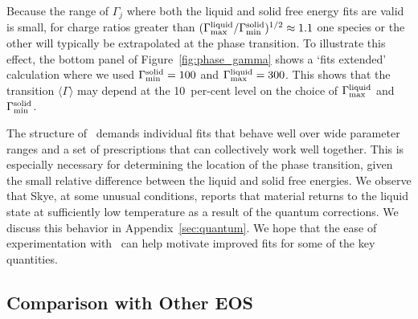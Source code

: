 %
%
%
Because the range of $\Gamma_j$ where both the liquid and solid free
energy fits are valid is small, for charge ratios greater than
$(\Gamma_{\rm max}^{\rm liquid}/\Gamma_{\rm min}^{\rm solid})^{1/2}
\approx 1.1$ one species or the other will typically be extrapolated
at the phase transition.  To illustrate this effect, the bottom panel
of Figure~\ref{fig:phase_gamma} shows a `fits extended' calculation
where we used $\Gamma_{\rm min}^{\rm solid}=100$ and
$\Gamma_{\rm max}^{\rm liquid} = 300$.  This shows that the
transition $\langle\Gamma\rangle$ may depend at the 10~per-cent level
on the choice of $\Gamma_{\rm max}^{\rm liquid}$ and $\Gamma_{\rm min}^{\rm solid}$.
%


The structure of \skye\ demands individual fits
that behave well over wide parameter ranges and a set of prescriptions
that can collectively work well together.
%
This is especially necessary for determining the location of the phase
transition, given the small relative difference between the liquid and
solid free energies.
%
We observe that Skye, at some unusual conditions, 
reports that material returns to the liquid state at sufficiently low
temperature as a result of the quantum corrections.
We discuss this behavior in Appendix~\ref{sec:quantum}.
%
We hope that the ease of
experimentation with \skye\ can help motivate improved fits for some
of the key quantities.


\subsection{Comparison with Other EOS}


